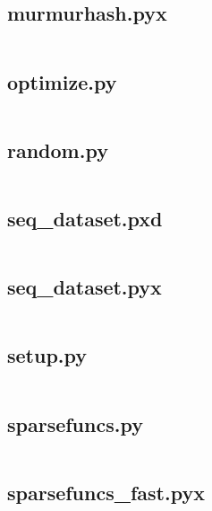 \documentclass{article}
\begin{document}
\subsection{murmurhash.pyx}
\inputminted{cython}{/home/dufferzafar/dev/@clones/scikit-learn/sklearn/utils/murmurhash.pyx}
\newpage

\subsection{optimize.py}
\inputminted{python}{/home/dufferzafar/dev/@clones/scikit-learn/sklearn/utils/optimize.py}
\newpage

\subsection{random.py}
\inputminted{python}{/home/dufferzafar/dev/@clones/scikit-learn/sklearn/utils/random.py}
\newpage

\subsection{seq\_dataset.pxd}
\inputminted{cython}{/home/dufferzafar/dev/@clones/scikit-learn/sklearn/utils/seq_dataset.pxd}
\newpage

\subsection{seq\_dataset.pyx}
\inputminted{cython}{/home/dufferzafar/dev/@clones/scikit-learn/sklearn/utils/seq_dataset.pyx}
\newpage

\subsection{setup.py}
\inputminted{python}{/home/dufferzafar/dev/@clones/scikit-learn/sklearn/utils/setup.py}
\newpage

\subsection{sparsefuncs.py}
\inputminted{python}{/home/dufferzafar/dev/@clones/scikit-learn/sklearn/utils/sparsefuncs.py}
\newpage

\subsection{sparsefuncs\_fast.pyx}
\inputminted{cython}{/home/dufferzafar/dev/@clones/scikit-learn/sklearn/utils/sparsefuncs_fast.pyx}
\newpage
\end{document}
